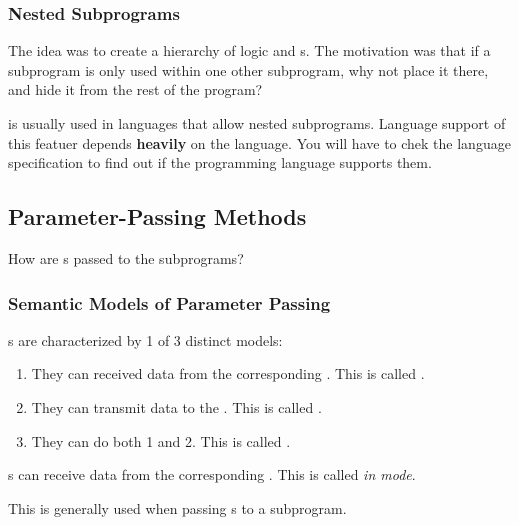 \subsubsection{Nested Subprograms}\label{subsubsec:Nested_Subprograms}
The idea was to create a hierarchy of logic and s.
The motivation was that if a subprogram is only used within one other subprogram, why not place it there, and hide it from the rest of the program?

 is usually used in languages that allow nested subprograms.
Language support of this featuer depends \textbf{heavily} on the language.
You will have to chek the language specification to find out if the programming language supports them.

\subsection{Parameter-Passing Methods}\label{subsec:Parameter_Passing_Methods}
How are s passed to the subprograms?

\subsubsection{Semantic Models of Parameter Passing}\label{subsubsec:Semantic_Models_Parameter_Passing}
s are characterized by 1 of 3 distinct  models:
\begin{enumerate}[noitemsep]
\item They can received data from the corresponding . This is called \textbf{}.
\item They can transmit data to the . This is called \textbf{}.
\item They can do both 1 and 2. This is called \textbf{}.
\end{enumerate}

\begin{definition}[In Mode]\label{def:Parameter_Passing-In_Mode}
  s can receive data from the corresponding .
  This is called \emph{in mode}.

  This is generally used when passing s to a subprogram.
\end{definition}

